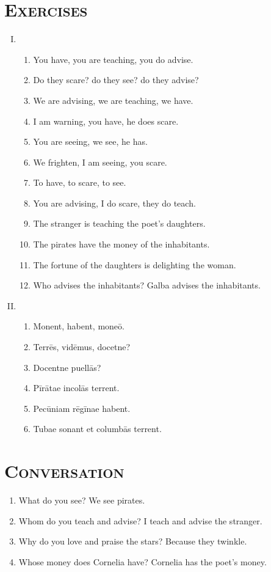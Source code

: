 \documentclass[12pt]{article}
\begin{document}
\section{\textsc{Exercises}}
\begin{enumerate}[I.]
	\setlength{\itemsep}{1em}
	\item \begin{enumerate}[1)]
		\item You have, you are teaching, you do advise.
		\item Do they scare? do they see? do they advise?
		\item We are advising, we are teaching, we have.
		\item I am warning, you have, he does scare.
		\item You are seeing, we see, he has.
		\item We frighten, I am seeing, you scare.
		\item To have, to scare, to see.
		\item You are advising, I do scare, they do teach.
		\item The stranger is teaching the poet's daughters.
		\item The pirates have the money of the inhabitants.
		\item The fortune of the daughters is delighting the woman.
		\item Who advises the inhabitants? Galba advises the inhabitants.
	\end{enumerate}
	\item \begin{enumerate}[1)]
		\item Monent, habent, moneō.
		\item Terrēs, vidēmus, docetne?
		\item Docentne puellās?
		\item Pīrātae incolās terrent.
		\item Pecūniam rēgīnae habent.
		\item Tubae sonant et columbās terrent.
	\end{enumerate}
\end{enumerate}

\section{\textsc{Conversation}}
\begin{enumerate}[1.]
	\item What do you see? We see pirates.
	\item Whom do you teach and advise? I teach and advise the stranger.
	\item Why do you love and praise the stars? Because they twinkle.
	\item Whose money does Cornelia have? Cornelia has the poet's money.
\end{enumerate}
\end{document}

